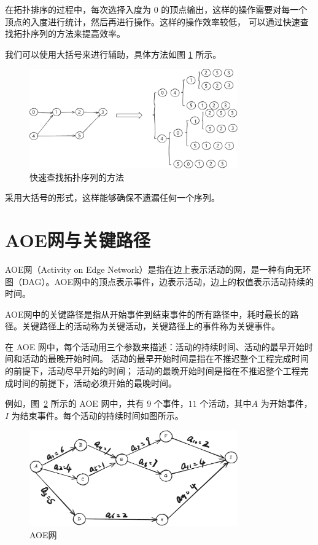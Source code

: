 \documentclass[lang=cn,newtx,10pt,scheme=chinese]{../elegantbook}
\begin{document}
在拓扑排序的过程中，每次选择入度为 $0$ 的顶点输出，这样的操作需要对每一个顶点的入度进行统计，然后再进行操作。这样的操作效率较低，
可以通过快速查找拓扑序列的方法来提高效率。

我们可以使用大括号来进行辅助，具体方法如图 \ref{fig:topoMethod} 所示。

\begin{figure}[!htbp]
  \centering
  \includegraphics[width=0.8\textwidth]{./figure/pdf/cropped/topoMethod.pdf}
  \caption{快速查找拓扑序列的方法}
  \label{fig:topoMethod}
\end{figure}

采用大括号的形式，这样能够确保不遗漏任何一个序列。
\section{AOE网与关键路径}

AOE网（Activity on Edge Network）是指在边上表示活动的网，是一种有向无环图（DAG）。AOE网中的顶点表示事件，边表示活动，边上的权值表示活动持续的时间。

AOE网中的关键路径是指从开始事件到结束事件的所有路径中，耗时最长的路径。关键路径上的活动称为关键活动，关键路径上的事件称为关键事件。

在 AOE 网中，每个活动用三个参数来描述：活动的持续时间、活动的最早开始时间和活动的最晚开始时间。
活动的最早开始时间是指在不推迟整个工程完成时间的前提下，活动尽早开始的时间；
活动的最晚开始时间是指在不推迟整个工程完成时间的前提下，活动必须开始的最晚时间。

例如，图~\ref{fig:AOE} 所示的 AOE 网中，共有 $9$ 个事件，$11$ 个活动，其中$A$ 为开始事件，$I$ 为结束事件。每个活动的持续时间如图所示。

\begin{figure}[!htbp]
  \centering
  \includegraphics[width=0.8\textwidth]{./figure/pdf/cropped/AOE.pdf}
  \caption{AOE网}
  \label{fig:AOE}
\end{figure}
\end{document}
